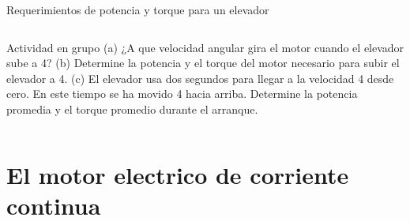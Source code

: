 \documentclass[presentation,aspectratio=169]{beamer}
\begin{document}
\begin{frame}[label={sec:org0ac4a5b}]{Requerimientos de potencia y torque para un elevador}
\begin{columns}
\begin{column}{0.72\columnwidth}
 \alert{Actividad en grupo} 
\alert{(a)} ¿A que velocidad angular gira el motor cuando el elevador sube a \unit{4}{\meter\per\second}? \alert{(b)} Determine la potencia y el torque del motor necesario para subir el elevador a \unit{4}{\meter\per\second}. \alert{(c)} El elevador usa dos segundos para llegar a la velocidad \unit{4}{\meter\per\second} desde cero. En este tiempo se ha movido \unit{4}{\meter} hacia arriba. Determine la potencia promedia y el torque promedio durante el arranque.
\end{column}
\end{columns}
\end{frame}

\section{El motor electrico de corriente continua}
\label{sec:orgd8a4f70}
\end{document}
